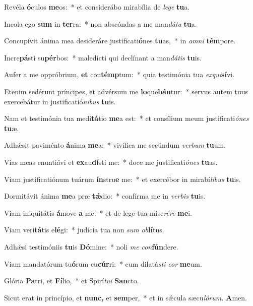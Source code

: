 \item Revéla \textbf{ó}culos \textbf{me}os:~* et considerábo mirabília de \textit{lege} \textbf{tu}a.
\item Incola ego \textbf{sum} in \textbf{ter}ra:~* non abscóndas a me man\tinyhspace\textit{dáta} \textbf{tu}a.
\item Concupívit ánima mea desideráre justificati\textbf{ó}nes \textbf{tu}as,~* in \textit{omni} \textbf{tém}pore.
\item Incre\textbf{pá}sti su\textbf{pér}bos:~* maledícti qui declínant a man\tinyhspace\textit{dátis} \textbf{tu}is.
\item Aufer a me oppróbrium, \textbf{et} con\textbf{témp}tum:~* quia testimónia tua \textit{exqui}\textbf{sí}vi.
\item Etenim sedérunt príncipes, et advérsum me \textbf{lo}que\textbf{bán}tur:~* servus autem tuus exercebátur in justificatió\textit{nibus} \textbf{tu}is.
\item Nam et testimónia tua medi\textbf{tá}tio \textbf{me}a est:~* et consílium meum justificati\textit{ónes} \textbf{tu}æ.
\item Adhǽsit paviménto \textbf{á}nima \textbf{me}a:~* vivífica me secúndum \textit{verbum} \textbf{tu}um.
\item Vias meas enuntiávi et \textbf{ex}au\textbf{dí}sti me:~* doce me justificati\textit{ónes} \textbf{tu}as.
\item Viam justificatiónum tuárum \textbf{ín}stru\textbf{e} me:~* et exercébor in mirabí\textit{libus} \textbf{tu}is.
\item Dormitávit ánima \textbf{me}a præ \textbf{tǽ}dio:~* confírma me in \textit{verbis} \textbf{tu}is.
\item Viam iniquitátis \textbf{á}move \textbf{a} me:~* et de lege tua mise\textit{rére} \textbf{me}i.
\item Viam veri\textbf{tá}tis e\textbf{lé}gi:~* judícia tua non \textit{sum} \textit{ob}\textbf{lí}tus.
\item Adhǽsi testimóniis \textbf{tu}is \textbf{Dó}mine:~* noli \textit{me} \textit{con}\textbf{fún}dere.
\item Viam mandatórum tu\textbf{ó}rum cu\textbf{cúr}ri:~* cum dilatá\textit{sti} \textit{cor} \textbf{me}um.
\item Glória \textbf{Pa}tri, et \textbf{Fí}lio,~* et Spirí\tinyhspace\textit{tui} \textbf{San}cto.
\item Sicut erat in princípio, et \textbf{nunc,} et \textbf{sem}per,~* et in sǽcula sæcu\tinyhspace\textit{lórum.} \textbf{A}men.